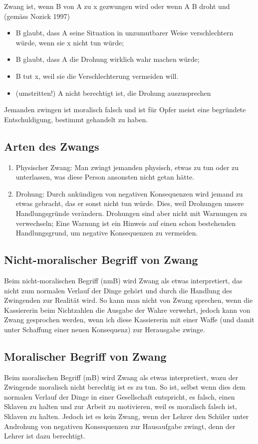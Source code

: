 \documentclass[../main.tex]{subfiles}
\begin{document}
\begin{warningbox}
Zwang ist, wenn B von A zu x gezwungen wird oder wenn A B droht und (gemäss Nozick 1997)
\begin{itemize}
	\item B glaubt, dass A seine Situation in unzumutbarer Weise verschlechtern würde, wenn sie x nicht tun würde;
	\item B glaubt, dass A die Drohung wirklich wahr machen  würde;
	\item B tut x, weil sie die Verschlechterung vermeiden will.
	\item (umstritten!) A nicht berechtigt ist, die Drohung auszusprechen
\end{itemize}
\end{warningbox}


Jemanden zwingen ist moralisch falsch und ist für Opfer meist eine begründete Entschuldigung, bestimmt gehandelt zu haben. 

\subsection{Arten des Zwangs}
\begin{enumerate}
	\item Physischer Zwang: Man zwingt jemanden physisch, etwas zu tun oder zu unterlassen, was diese Person ansonsten nicht getan hätte.
	\item Drohung: Durch ankündigen von negativen Konsequenzen wird jemand zu etwas gebracht, das er sonst nicht tun würde. Dies, weil Drohungen unsere Handlungsgründe verändern. Drohungen sind aber nicht mit Warnungen zu verwechseln; Eine Warnung ist ein Hinweis auf einen schon bestehenden Handlungsgrund, um negative Konsequenzen zu vermeiden. 
\end{enumerate}

\subsection{Nicht-moralischer Begriff von Zwang}
Beim nicht-moralischen Begriff (nmB) wird Zwang als etwas interpretiert, das nicht zum normalen Verlauf der Dinge gehört und durch die Handlung des Zwingenden zur Realität wird. So kann man nicht von Zwang sprechen, wenn die Kassiererin beim Nichtzahlen die Ausgabe der Wahre verwehrt, jedoch kann von Zwang gesprochen werden, wenn ich diese Kassiererin mit einer Waffe (und damit unter Schaffung einer neuen Konsequenz) zur Herausgabe zwinge. 

\subsection{Moralischer Begriff von Zwang}
Beim moralischen Begriff (mB) wird Zwang als etwas interpretiert, wozu der Zwingende moralisch nicht berechtig ist es zu tun. So ist, selbst wenn dies dem normalen Verlauf der Dinge in einer Gesellschaft entspricht, es falsch, einen Sklaven zu halten und zur Arbeit zu motivieren, weil es moralisch falsch ist, Sklaven zu halten. Jedoch ist es kein Zwang, wenn der Lehrer den Schüler unter Androhung von negativen Konsequenzen zur Hausaufgabe zwingt, denn der Lehrer ist dazu berechtigt.
\end{document}

